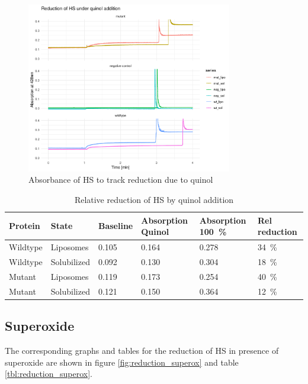 \begin{figure}
	\centering
	\includegraphics[width=0.8\textwidth]{img/reduction_quinol.png}
	\caption{Absorbance of HS to track reduction due to quinol}
	\label{fig:reduction_quinol}
\end{figure}


\begin{table}
	\centering
	\begin{tabu}{llllll}
		\toprule
		Protein & State & Baseline & Absorption Quinol & Absorption \SI{100}{\percent} & Rel reduction \\
		\midrule
		Wildtype & Liposomes & 0.105 & 0.164 & 0.278 & \SI{34}{\percent} \\
		Wildtype & Solubilized & 0.092 & 0.130 & 0.304 & \SI{18}{\percent} \\
		Mutant & Liposomes & 0.119 & 0.173 & 0.254 & \SI{40}{\percent} \\
		Mutant & Solubilized & 0.121 & 0.150 & 0.364 & \SI{12}{\percent} \\
		\bottomrule
	\end{tabu}
	\caption{Relative reduction of HS by quinol addition}
	\label{tbl:reduction_quinol}
\end{table}

\subsection{Superoxide}

The corresponding graphs and tables for the reduction of HS in presence of
superoxide are shown in figure \ref{fig:reduction_superox} and table
\ref{tbl:reduction_superox}.

